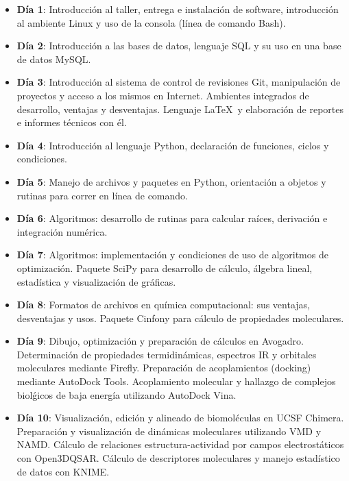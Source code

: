 \documentclass[10pt,letterpaper]{article}
\begin{document}
\begin{itemize}
\item \textbf{D\'ia 1}: Introducci\'on al taller, entrega e instalaci\'on de software, introducci\'on al ambiente Linux y uso de la consola (l\'inea de comando Bash).
\item \textbf{D\'ia 2}: Introducci\'on a las bases de datos, lenguaje SQL y su uso en una base de datos MySQL.
\item \textbf{D\'ia 3}: Introducci\'on al sistema de control de revisiones Git, manipulaci\'on de proyectos y acceso a los mismos en Internet. Ambientes integrados de desarrollo, ventajas y desventajas. Lenguaje \LaTeX\ y elaboraci\'on de reportes e informes t\'ecnicos con \'el.
\item \textbf{D\'ia 4}: Introducci\'on al lenguaje Python, declaraci\'on de funciones, ciclos y condiciones.
\item \textbf{D\'ia 5}: Manejo de archivos y paquetes en Python, orientaci\'on a objetos y rutinas para correr en l\'inea de comando.
\item \textbf{D\'ia 6}: Algoritmos: desarrollo de rutinas para calcular ra\'ices, derivaci\'on e integraci\'on num\'erica.
\item \textbf{D\'ia 7}: Algoritmos: implementaci\'on y condiciones de uso de algoritmos de optimizaci\'on. Paquete SciPy para desarrollo de c\'alculo, \'algebra lineal, estad\'istica y visualizaci\'on de gr\'aficas.
\item \textbf{D\'ia 8}: Formatos de archivos en qu\'imica computacional: sus ventajas, desventajas y usos. Paquete Cinfony para c\'alculo de propiedades moleculares.
\item \textbf{D\'ia 9}: Dibujo, optimizaci\'on y preparaci\'on de c\'alculos en Avogadro. Determinaci\'on de propiedades termidin\'amicas, espectros IR y orbitales moleculares mediante Firefly. Preparaci\'on de acoplamientos (docking) mediante AutoDock Tools. Acoplamiento molecular y hallazgo de complejos biol\'gicos de baja energ\'ia utilizando AutoDock Vina.
\item \textbf{D\'ia 10}: Visualizaci\'on, edici\'on y alineado de biomol\'eculas en UCSF Chimera. Preparaci\'on y visualizaci\'on de din\'amicas moleculares utilizando VMD y NAMD. C\'alculo de relaciones estructura-actividad por campos electrost\'aticos con Open3DQSAR. C\'alculo de descriptores moleculares y manejo estad\'istico de datos con KNIME.
\end{itemize}
\end{document}
